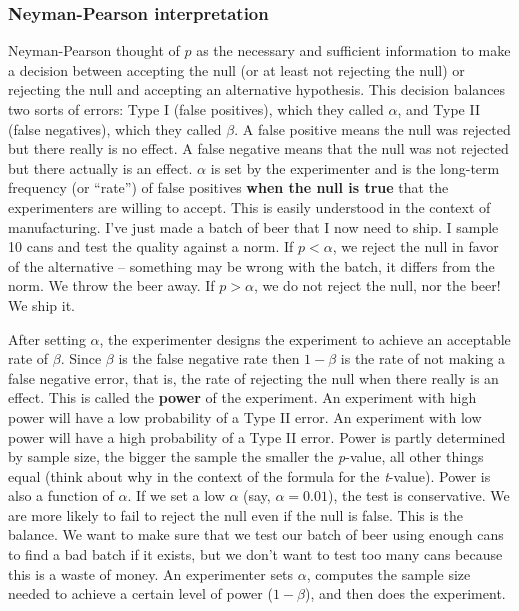 \documentclass[]{book}
\begin{document}
\hypertarget{neyman-pearson-interpretation}{%
\subsubsection{Neyman-Pearson interpretation}\label{neyman-pearson-interpretation}}

Neyman-Pearson thought of \(p\) as the necessary and sufficient information to make a decision between accepting the null (or at least not rejecting the null) or rejecting the null and accepting an alternative hypothesis. This decision balances two sorts of errors: Type I (false positives), which they called \(\alpha\), and Type II (false negatives), which they called \(\beta\). A false positive means the null was rejected but there really is no effect. A false negative means that the null was not rejected but there actually is an effect. \(\alpha\) is set by the experimenter and is the long-term frequency (or ``rate'') of false positives \textbf{when the null is true} that the experimenters are willing to accept. This is easily understood in the context of manufacturing. I've just made a batch of beer that I now need to ship. I sample 10 cans and test the quality against a norm. If \(p < \alpha\), we reject the null in favor of the alternative -- something may be wrong with the batch, it differs from the norm. We throw the beer away. If \(p > \alpha\), we do not reject the null, nor the beer! We ship it.

After setting \(\alpha\), the experimenter designs the experiment to achieve an acceptable rate of \(\beta\). Since \(\beta\) is the false negative rate then \(1-\beta\) is the rate of not making a false negative error, that is, the rate of rejecting the null when there really is an effect. This is called the \textbf{power} of the experiment. An experiment with high power will have a low probability of a Type II error. An experiment with low power will have a high probability of a Type II error. Power is partly determined by sample size, the bigger the sample the smaller the \emph{p}-value, all other things equal (think about why in the context of the formula for the \emph{t}-value). Power is also a function of \(\alpha\). If we set a low \(\alpha\) (say, \(\alpha=0.01\)), the test is conservative. We are more likely to fail to reject the null even if the null is false. This is the balance. We want to make sure that we test our batch of beer using enough cans to find a bad batch if it exists, but we don't want to test too many cans because this is a waste of money. An experimenter sets \(\alpha\), computes the sample size needed to achieve a certain level of power (\(1-\beta\)), and then does the experiment.
\end{document}
